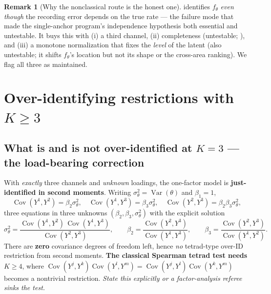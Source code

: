 \documentclass[11pt]{article}
\theoremstyle{definition}
\newtheorem{remark}{Remark}
\newcommand{\Var}{\operatorname{Var}}
\newcommand{\Cov}{\operatorname{Cov}}
\newcommand{\Th}{\theta}
\newcommand{\lat}{\Th}
\begin{document}
\begin{remark}[Why the nonclassical route is the honest one]
 identifies $f_\lat$ \emph{even though} the recording error
depends on the true rate --- the failure mode that made the single-anchor
program's independence hypothesis both essential and untestable. It buys this
with (i) a third channel, (ii) completeness (untestable; ),
and (iii) a monotone normalization that fixes the \emph{level} of the latent
(also untestable; it shifts $f_\lat$'s location but not its shape or the
cross-area ranking). We flag all three as maintained.
\end{remark}

\section{Over-identifying restrictions with $K\ge 3$}\label{sec:overid}

\subsection{What is and is not over-identified at $K=3$ --- the load-bearing
correction}

With \emph{exactly} three channels and \emph{unknown} loadings, the one-factor
model is \textbf{just-identified in second moments}. Writing
$\sigma_\lat^2=\Var(\lat)$ and $\beta_1=1$,
\begin{equation}\label{eq:tetrad-just}
  \Cov(Y^1,Y^2)=\beta_2\sigma_\lat^2,\quad
  \Cov(Y^1,Y^3)=\beta_3\sigma_\lat^2,\quad
  \Cov(Y^2,Y^3)=\beta_2\beta_3\sigma_\lat^2,
\end{equation}
three equations in three unknowns $(\beta_2,\beta_3,\sigma_\lat^2)$ with the
explicit solution
\begin{equation}\label{eq:tetrad-solve}
  \sigma_\lat^2=\frac{\Cov(Y^1,Y^2)\,\Cov(Y^1,Y^3)}{\Cov(Y^2,Y^3)},\qquad
  \beta_2=\frac{\Cov(Y^2,Y^3)}{\Cov(Y^1,Y^3)},\qquad
  \beta_3=\frac{\Cov(Y^2,Y^3)}{\Cov(Y^1,Y^2)}.
\end{equation}
There are \textbf{zero} covariance degrees of freedom left, hence \emph{no}
tetrad-type over-ID restriction from second moments. \textbf{The classical
Spearman tetrad test needs $K\ge 4$}, where
$\Cov(Y^j,Y^k)\Cov(Y^l,Y^m)=\Cov(Y^j,Y^l)\Cov(Y^k,Y^m)$ becomes a nontrivial
restriction. \emph{State this explicitly or a factor-analysis referee sinks
the test.}
\end{document}
